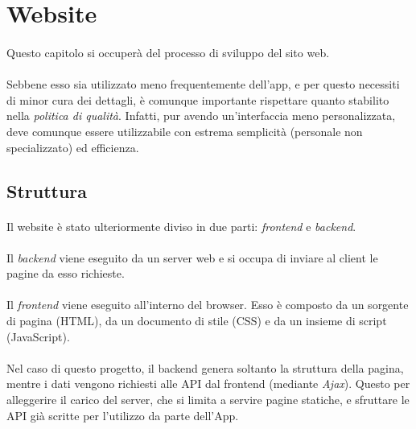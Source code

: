 \documentclass[11pt,a4paper,english]{article}
\begin{document}
\section{Website}

\paragraph{} Questo capitolo si occuperà del processo di sviluppo del sito web. 

\paragraph{} Sebbene esso sia utilizzato meno frequentemente dell'app, e per questo necessiti di minor cura dei dettagli, è comunque importante rispettare quanto stabilito nella \emph{politica di qualità}. Infatti, pur avendo un'interfaccia meno personalizzata, deve comunque essere utilizzabile con estrema semplicità (personale non specializzato) ed efficienza.

\subsection{Struttura}

\paragraph{} Il website è stato ulteriormente diviso in due parti: \emph{frontend} e \emph{backend}. 

\paragraph{} Il \emph{backend} viene eseguito da un server web e si occupa di inviare al client le pagine da esso richieste. 

\paragraph{} Il \emph{frontend} viene eseguito all'interno del browser. Esso è composto da un sorgente di pagina (HTML), da un documento di stile (CSS) e da un insieme di script (JavaScript). 

\paragraph{} Nel caso di questo progetto, il backend genera soltanto la struttura della pagina, mentre i dati vengono richiesti alle API dal frontend (mediante \emph{Ajax}). Questo per alleggerire il carico del server, che si limita a servire pagine statiche, e sfruttare le API già scritte per l'utilizzo da parte dell'App. 
\end{document}
